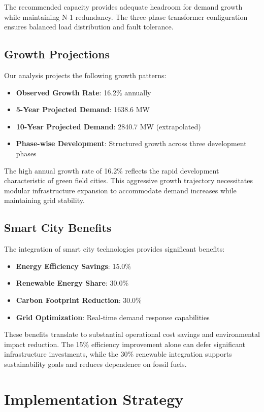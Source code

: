 \documentclass[12pt,a4paper]{article}
\begin{document}
The recommended capacity provides adequate headroom for demand growth while maintaining N-1 redundancy. The three-phase transformer configuration ensures balanced load distribution and fault tolerance.

\subsection{Growth Projections}
Our analysis projects the following growth patterns:

\begin{itemize}
    \item \textbf{Observed Growth Rate}: 16.2\% annually
    \item \textbf{5-Year Projected Demand}: 1638.6 MW
    \item \textbf{10-Year Projected Demand}: 2840.7 MW (extrapolated)
    \item \textbf{Phase-wise Development}: Structured growth across three development phases
\end{itemize}

The high annual growth rate of 16.2\% reflects the rapid development characteristic of green field cities. This aggressive growth trajectory necessitates modular infrastructure expansion to accommodate demand increases while maintaining grid stability.

\subsection{Smart City Benefits}
The integration of smart city technologies provides significant benefits:

\begin{itemize}
    \item \textbf{Energy Efficiency Savings}: 15.0\%
    \item \textbf{Renewable Energy Share}: 30.0\%
    \item \textbf{Carbon Footprint Reduction}: 30.0\%
    \item \textbf{Grid Optimization}: Real-time demand response capabilities
\end{itemize}

These benefits translate to substantial operational cost savings and environmental impact reduction. The 15\% efficiency improvement alone can defer significant infrastructure investments, while the 30\% renewable integration supports sustainability goals and reduces dependence on fossil fuels.

\section{Implementation Strategy}
\end{document}
